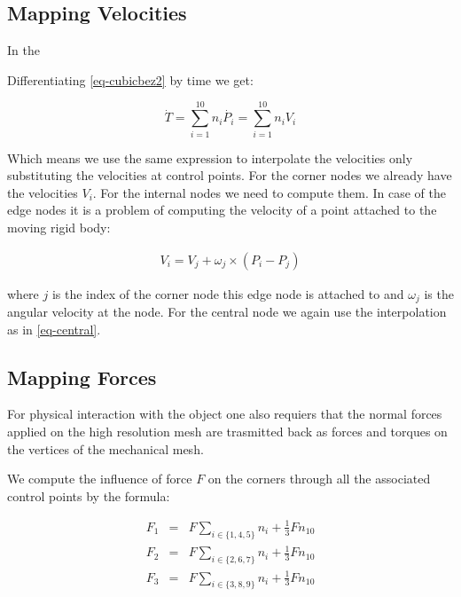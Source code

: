 \documentclass{egpubl}
\begin{document}
\subsection{Mapping Velocities}

In the 

Differentiating \eqref{eq-cubicbez2} by time we get:

\begin{equation}
    \dot{T} = \sum_{i=1}^{10} n_i \dot{P_i} = \sum_{i=1}^{10} n_i V_i
\end{equation}

Which means we use the same expression to interpolate the velocities only
substituting the velocities at control points. For the corner nodes we
already have the velocities $V_i$. For the internal nodes we need to compute
them. In case of the edge nodes it is a problem of computing the velocity
of a point attached to the moving rigid body:

\begin{eqnarray}
    V_i = V_j + \omega_j \times (P_i - P_j)
\end{eqnarray}

where $j$ is the index of the corner node this edge node is attached to and
$\omega_j$ is the angular velocity at the node. For the central node we
again use the interpolation as in \eqref{eq-central}.

\subsection{Mapping Forces}

For physical interaction with the object one also requiers that the normal
forces applied on the high resolution mesh are trasmitted back as forces
and torques on the vertices of the mechanical mesh.

We compute the influence of force $F$ on the corners through all the
associated control points by the formula:

\begin{eqnarray}
    F_1 & = & F \sum_{i \in \{1,4,5\}} n_i + \frac{1}{3} F n_{10} \\
    F_2 & = & F \sum_{i \in \{2,6,7\}} n_i + \frac{1}{3} F n_{10} \\
    F_3 & = & F \sum_{i \in \{3,8,9\}} n_i + \frac{1}{3} F n_{10}
\end{eqnarray}

\end{document}
